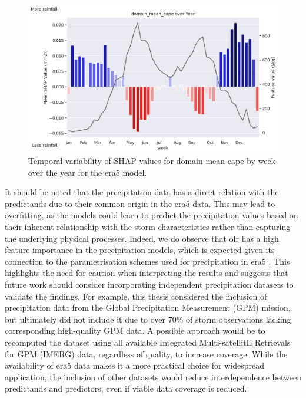 \begin{figure}[ht]
    \centering
    \includegraphics[width=\textwidth]{../figures/generated/experiments/obs_precipitation/temporal_corr/obs_precipitation_era5_shap_domain_mean_cape_by_week_over_year.png}
    \caption{Temporal variability of SHAP values for domain mean \acrshort{cape} by week over the year for the \acrshort{era5} model.}
    \label{fig:obs_precipitation_era5_shap_domain_mean_cape_by_week_over_year}
\end{figure}

It should be noted that the precipitation data has a direct relation with the predictands due to their common origin in the \acrshort{era5} data. This may lead to overfitting, as the models could learn to predict the precipitation values based on their inherent relationship with the storm characteristics rather than capturing the underlying physical processes. Indeed, we do observe that \acrshort{olr} has a high feature importance in the precipitation models, which is expected given its connection to the parametrisation schemes used for precipitation in \acrshort{era5} \citep{Hersbach2020}. This highlights the need for caution when interpreting the results and suggests that future work should consider incorporating independent precipitation datasets to validate the findings. For example, this thesis considered the inclusion of precipitation data from the Global Precipitation Measurement (GPM) mission, but ultimately did not include it due to over 70\% of storm observations lacking corresponding high-quality GPM data. A possible approach would be to recomputed the dataset using all available Integrated Multi-satellitE Retrievals for GPM (IMERG) data, regardless of quality, to increase coverage. While the availability of \acrshort{era5} data makes it a more practical choice for widespread application, the inclusion of other datasets would reduce interdependence between predictands and predictors, even if viable data coverage is reduced.